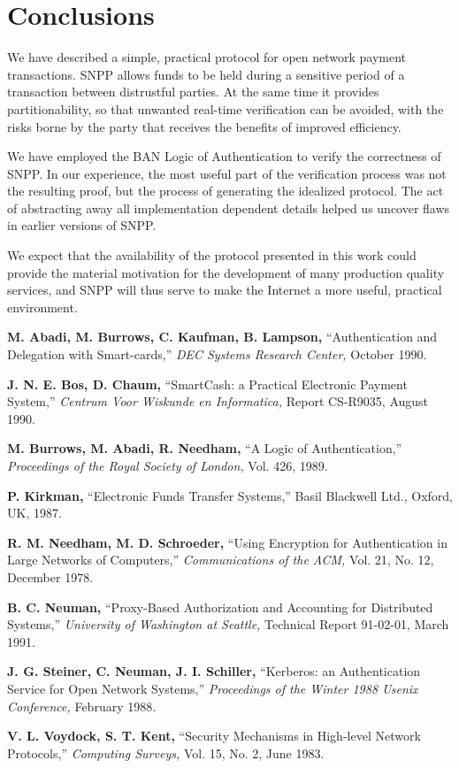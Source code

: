 \section{Conclusions}

We have described a simple, practical protocol for open network
payment transactions.  SNPP allows funds to be held during a sensitive
period of a transaction between distrustful parties.  At the same time
it provides partitionability, so that unwanted real-time verification
can be avoided, with the risks borne by the party that receives
the benefits of improved efficiency.

We have employed the BAN Logic of Authentication to verify the
correctness of SNPP.  In our experience, the most useful part of the
verification process was not the resulting proof, but the process of
generating the idealized protocol.  The act of abstracting away all
implementation dependent details helped us uncover flaws in
earlier versions of SNPP.

We expect that the availability of the protocol presented in this work
could provide the material motivation for the development of many
production quality services, and SNPP will thus serve to make the
Internet a more useful, practical environment.

\newpage
\begin{thebibliography}{99}

{\bf M. Abadi, M. Burrows, C. Kaufman, B. Lampson,}
``Authentication and Delegation with Smart-cards,''
{\it DEC Systems Research Center,}
October 1990.

{\bf J. N. E. Bos, D. Chaum,}
``SmartCash: a Practical Electronic Payment System,''
{\it Centrum Voor Wiskunde en Informatica,}
Report CS-R9035, August 1990.

{\bf M. Burrows, M. Abadi, R. Needham,}
``A Logic of Authentication,''
{\it Proceedings of the Royal Society of London,}
Vol. 426, 1989.

{\bf P. Kirkman,}
``Electronic Funds Transfer Systems,''
Basil Blackwell Ltd.,
Oxford, UK, 1987.

{\bf R. M. Needham, M. D. Schroeder,}
``Using Encryption for Authentication in Large Networks of Computers,''
{\it Communications of the ACM,}
Vol. 21, No. 12, December 1978.

{\bf B. C. Neuman,}
``Proxy-Based Authorization and Accounting for Distributed Systems,''
{\it University of Washington at Seattle,}
Technical Report 91-02-01,
March 1991.

{\bf J. G. Steiner, C. Neuman, J. I. Schiller,}
``Kerberos: an Authentication Service for Open Network Systems,''
{\it Proceedings of the Winter 1988 Usenix Conference,}
February 1988.

{\bf V. L. Voydock, S. T. Kent,}
``Security Mechanisms in High-level Network Protocols,''
{\it Computing Surveys,}
Vol. 15, No. 2, June 1983.

\end{thebibliography}
